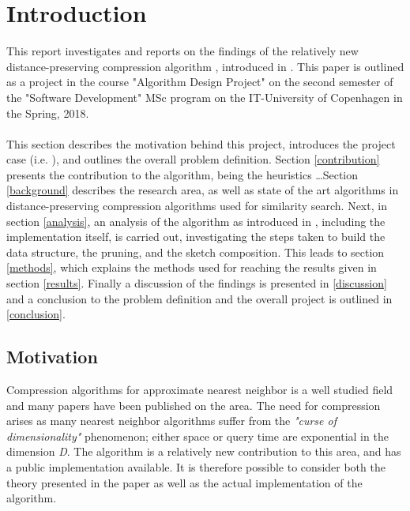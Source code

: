 \section{Introduction}
\label{introduction}
This report investigates and reports on the findings of the relatively new distance-preserving compression algorithm \qs{}, introduced in \cite{wagner17}. This paper is outlined as a project in the course "Algorithm Design Project" on the second semester of the "Software Development" MSc program on the IT-University of Copenhagen in the Spring, 2018.
\\
\\
This section describes the motivation behind this project, introduces the project case (i.e. \qs{}), and outlines the overall problem definition. Section \ref{contribution} presents the contribution to the algorithm, being the heuristics \dots Section \ref{background} describes the research area, as well as state of the art algorithms in distance-preserving compression algorithms used for similarity search. Next, in section \ref{analysis}, an analysis of the algorithm as introduced in \cite{wagner17}, including the \qs{} implementation itself, is carried out, investigating the steps taken to build the data structure, the pruning, and the sketch composition. This leads to section \ref{methods}, which explains the methods used for reaching the results given in section \ref{results}. Finally a discussion of the findings is presented in \ref{discussion} and a conclusion to the problem definition and the overall project is outlined in \ref{conclusion}.

\subsection{Motivation} %
Compression algorithms for approximate nearest neighbor is a well studied field and many papers have been published on the area. The need for compression arises as many nearest neighbor algorithms suffer from the \textit{"curse of dimensionality"} phenomenon; either space or query time are exponential in the dimension \textit{D}\cite{ilya15}. The \qs{} algorithm is a relatively new contribution to this area, and has a public implementation available. It is therefore possible to consider both the theory presented in the paper as well as the actual implementation of the algorithm. %
